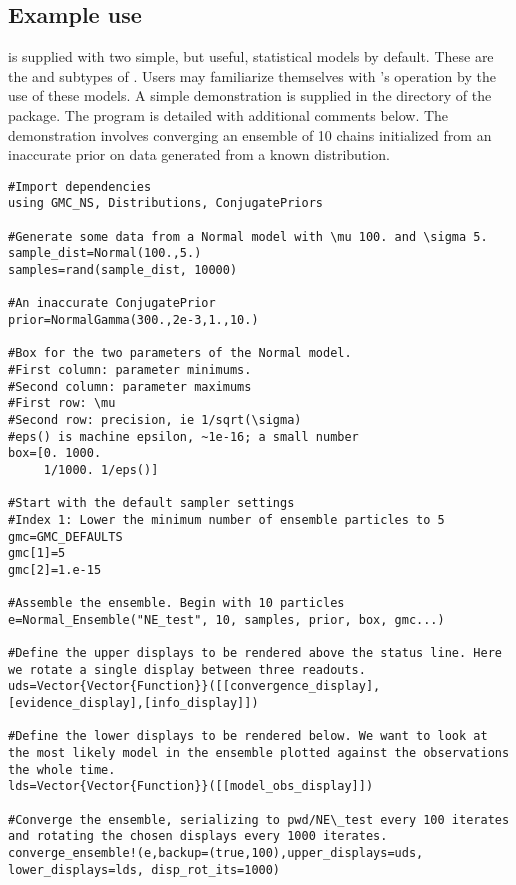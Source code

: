 \subsection{Example use}
 is supplied with two simple, but useful, statistical models by default. These are the  and  subtypes of . Users may familiarize themselves with 's operation by the use of these models. A simple demonstration is supplied in the  directory of the package. The program is detailed with additional comments below. The demonstration involves converging an ensemble of 10  chains initialized from an inaccurate  prior on data generated from a known  distribution.

\begin{verbatim}
#Import dependencies
using GMC_NS, Distributions, ConjugatePriors

#Generate some data from a Normal model with \mu 100. and \sigma 5. 
sample_dist=Normal(100.,5.)
samples=rand(sample_dist, 10000)

#An inaccurate ConjugatePrior
prior=NormalGamma(300.,2e-3,1.,10.) 

#Box for the two parameters of the Normal model.
#First column: parameter minimums.
#Second column: parameter maximums
#First row: \mu
#Second row: precision, ie 1/sqrt(\sigma)
#eps() is machine epsilon, ~1e-16; a small number
box=[0. 1000.
     1/1000. 1/eps()]

#Start with the default sampler settings
#Index 1: Lower the minimum number of ensemble particles to 5
gmc=GMC_DEFAULTS
gmc[1]=5
gmc[2]=1.e-15

#Assemble the ensemble. Begin with 10 particles
e=Normal_Ensemble("NE_test", 10, samples, prior, box, gmc...)

#Define the upper displays to be rendered above the status line. Here we rotate a single display between three readouts.
uds=Vector{Vector{Function}}([[convergence_display],[evidence_display],[info_display]])

#Define the lower displays to be rendered below. We want to look at the most likely model in the ensemble plotted against the observations the whole time.
lds=Vector{Vector{Function}}([[model_obs_display]])

#Converge the ensemble, serializing to pwd/NE\_test every 100 iterates and rotating the chosen displays every 1000 iterates.
converge_ensemble!(e,backup=(true,100),upper_displays=uds, lower_displays=lds, disp_rot_its=1000)
\end{verbatim}

